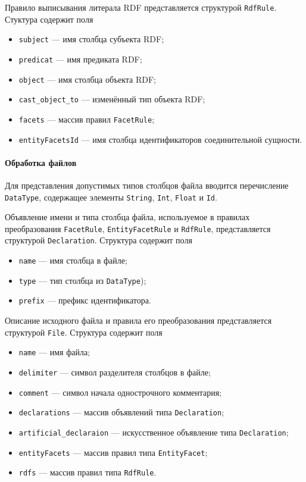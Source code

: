 Правило выписывания литерала RDF представляется структурой \texttt{RdfRule}. Стуктура содержит поля
\begin{itemize}
  \item \texttt{subject} --- имя столбца субъекта RDF;
  \item \texttt{predicat} --- имя предиката RDF;
  \item \texttt{object} --- имя столбца объекта RDF;
  \item \texttt{cast\_object\_to} --- изменённый тип объекта RDF;
  \item \texttt{facets} --- массив правил \texttt{FacetRule};
  \item \texttt{entityFacetsId} --- имя столбца идентификаторов соединительной сущности.
\end{itemize}

\paragraph{Обработка файлов}

Для представления допустимых типов столбцов файла вводится перечисление \texttt{DataType}, содержащее элементы
\texttt{String}, \texttt{Int}, \texttt{Float} и \texttt{Id}.

Объявление имени и типа столбца файла, используемое в правилах преобразования \texttt{FacetRule},
\texttt{EntityFacetRule} и \texttt{RdfRule}, представляется структурой \texttt{Declaration}. Структура содержит поля
\begin{itemize}
  \item \texttt{name} --- имя столбца в файле;
  \item \texttt{type} --- тип столбца из \texttt{DataType});
  \item \texttt{prefix} --- префикс идентификатора.
\end{itemize}

Описание исходного файла и правила его преобразования представляется структурой \texttt{File}. Структура содержит поля
\begin{itemize}
  \item \texttt{name} --- имя файла;
  \item \texttt{delimiter} --- символ разделителя столбцов в файле;
  \item \texttt{comment} --- символ начала однострочного комментария;
  \item \texttt{declarations} --- массив объявлений типа \texttt{Declaration};
  \item \texttt{artificial\_declaraion} --- искусственное объявление типа \texttt{Declaration};
  \item \texttt{entityFacets} --- массив правил типа \texttt{EntityFacet};
  \item \texttt{rdfs} --- массив правил типа \texttt{RdfRule}.
\end{itemize}

